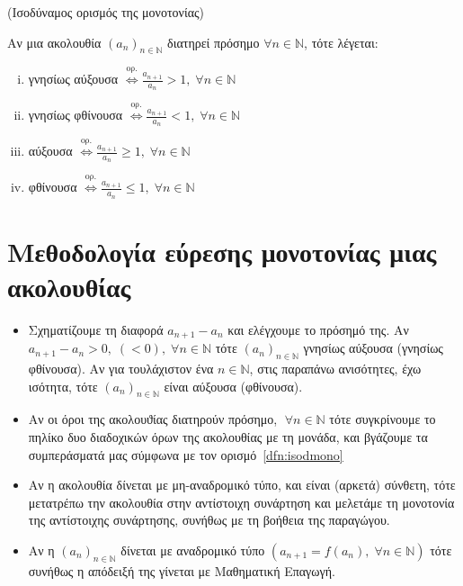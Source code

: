 \documentclass[main.tex]{subfiles}
\begin{document}
\begin{dfn}\label{dfn:isodmono}(Ισοδύναμος ορισμός της μονοτονίας)
\item {}
    Αν μια ακολουθία $ (a_{n})_{n \in \mathbb{N}} $ \textcolor{Col1}
    {διατηρεί πρόσημο}
    $ \forall n \in \mathbb{N} $, τότε λέγεται:
    \begin{enumerate}[i)]
        \item \textcolor{Col\thechapter}{γνησίως αύξουσα} 
            $ \overset{\text{ορ.}}{\Leftrightarrow} 
            \frac{a_{n+1}}{a_{n}} > 1, \; \forall n \in \mathbb{N}$
        \item \textcolor{Col\thechapter}{γνησίως φθίνουσα} 
            $ \overset{\text{ορ.}}{\Leftrightarrow} 
            \frac{a_{n+1}}{a_{n}} < 1, \; \forall n \in \mathbb{N}$
        \item  \textcolor{Col\thechapter}{αύξουσα} 
            $ \overset{\text{ορ.}}{\Leftrightarrow} 
            \frac{a_{n+1}}{a_{n}} \geq 1, \; \forall n \in \mathbb{N} $
        \item  \textcolor{Col\thechapter}{φθίνουσα}
            $ \overset{\text{ορ.}}{\Leftrightarrow} 
            \frac{a_{n+1}}{a_{n}} \leq 1, \; \forall n \in \mathbb{N} $
    \end{enumerate}
\end{dfn}

\section{Μεθοδολογία εύρεσης μονοτονίας μιας ακολουθίας}
\begin{itemize}
    \item Σχηματίζουμε τη διαφορά $ a_{n+1} - a_n $ και ελέγχουμε το 
        πρόσημό της. Αν $ a_{n+1}-a_{n}>0, \; (<0), \; \forall n \in 
        \mathbb{N} $ τότε $ (a_{n})_{n \in \mathbb{N}}$ γνησίως 
        αύξουσα (γνησίως φθίνουσα). Αν για τουλάχιστον ένα 
        $ n \in \mathbb{N} $, στις παραπάνω ανισότητες, έχω ισότητα, 
        τότε  $ (a_{n})_{n \in \mathbb{N}} $ είναι αύξουσα (φθίνουσα).
    \item Αν οι όροι της ακολουϑίας διατηρούν πρόσημο, $ \; \forall n \in
        \mathbb{N} $ τότε συγκρίνουμε το πηλίκο δυο διαδοχικών όρων της 
        ακολουθίας με τη μονάδα, και βγάζουμε τα συμπεράσματά μας 
        σύμφωνα με τον ορισμό~\ref{dfn:isodmono}
    \item Αν η ακολουθία δίνεται με μη-αναδρομικό τύπο, και είναι 
        (αρκετά) σύνθετη, τότε μετατρέπω την ακολουθία στην αντίστοιχη 
        συνάρτηση και μελετάμε τη μονοτονία της αντίστοιχης συνάρτησης, 
        συνήθως με τη βοήθεια της παραγώγου.
    \item Αν η $ (a_{n})_{n \in \mathbb{N}} $ δίνεται με αναδρομικό 
        τύπο $ (a_{n+1}= f(a_{n}), \; \forall n \in \mathbb{N}) $ τότε 
        συνήθως η απόδειξή της γίνεται με Μαθηματική Επαγωγή.
\end{itemize}
\end{document}
